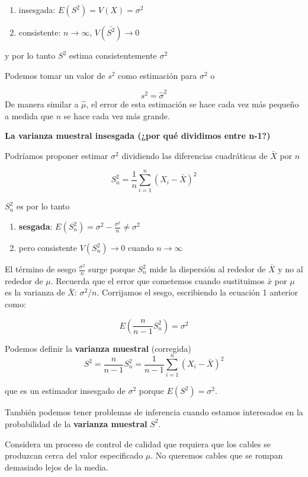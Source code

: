 \documentclass[
]{book}
\providecommand{\tightlist}{%
  \setlength{\itemsep}{0pt}\setlength{\parskip}{0pt}}
\begin{document}
\begin{enumerate}
\def\labelenumi{\arabic{enumi})}
\tightlist
\item
  insesgada: \(E(S^2)=V(X)=\sigma^2\)
\item
  consistente: \(n \rightarrow \infty\), \(V(\bar{S^2}) \rightarrow 0\)
\end{enumerate}

y por lo tanto \(S^2\) estima consistentemente \(\sigma^2\)

Podemos tomar un valor de \(s^2\) como estimación para \(\sigma^2\) o

\[s^2=\hat{\sigma}^2\]
De manera similar a \(\hat{\mu}\), el error de esta estimación se hace cada vez más pequeño a medida que \(n\) se hace cada vez más grande.

\textbf{La varianza muestral insesgada (¿por qué dividimos entre n-1?)}

Podríamos proponer estimar \(\sigma^2\) dividiendo las diferencias cuadráticas de \(\bar{X}\) por \(n\)

\[S_n^2=\frac{1}{n}\sum_{i=1}^n (X_i-\bar{X})^2\]

\(S_n^2\) es por lo tanto

\begin{enumerate}
\def\labelenumi{\arabic{enumi})}
\tightlist
\item
  \textbf{sesgada}: \(E(S_n^2) = \sigma^2-\frac{\sigma^2}{n} \neq \sigma^2\)
\item
  pero consistente \(V(S_n^2) \rightarrow 0\) cuando \(n\rightarrow \infty\)
\end{enumerate}

El término de sesgo \(\frac{\sigma^2}{n}\) surge porque \(S_n^2\) mide la dispersión al rededor de \(\bar{X}\) y no al rededor de \(\mu\). Recuerda que el error que cometemos cuando sustituimos \(\bar{x}\) por \(\mu\) es la varianza de \(\bar{X}\): \(\sigma^2/n\). Corrijamos el sesgo, escribiendo la ecuación 1 anterior como:

\[E(\frac{n}{n-1}S_n^2)=\sigma^2\]

Podemos definir la \textbf{varianza muestral} (corregida) \[S^2=\frac{n}{n-1}S_n^2=\frac{1}{n-1}\sum_{i=1}^n (X_i-\bar{X})^2\]

que es un estimador insesgado de \(\sigma^2\) porque \(E(S^2)=\sigma^2\).

También podemos tener problemas de inferencia cuando estamos interesados en la probabilidad de la \textbf{varianza muestral} \(S^2\).

Considera un proceso de control de calidad que requiera que los cables se produzcan cerca del valor especificado \(\mu\). No queremos cables que se rompan demasiado lejos de la media.
\end{document}
